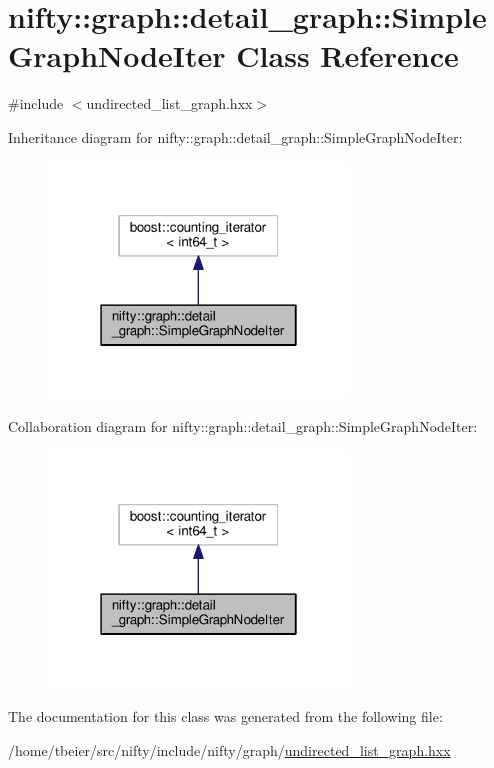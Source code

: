 \hypertarget{classnifty_1_1graph_1_1detail__graph_1_1SimpleGraphNodeIter}{}\section{nifty\+:\+:graph\+:\+:detail\+\_\+graph\+:\+:Simple\+Graph\+Node\+Iter Class Reference}
\label{classnifty_1_1graph_1_1detail__graph_1_1SimpleGraphNodeIter}


{\ttfamily \#include $<$undirected\+\_\+list\+\_\+graph.\+hxx$>$}



Inheritance diagram for nifty\+:\+:graph\+:\+:detail\+\_\+graph\+:\+:Simple\+Graph\+Node\+Iter\+:\nopagebreak
\begin{figure}[H]
\begin{center}
\leavevmode
\includegraphics[width=226pt]{classnifty_1_1graph_1_1detail__graph_1_1SimpleGraphNodeIter__inherit__graph}
\end{center}
\end{figure}


Collaboration diagram for nifty\+:\+:graph\+:\+:detail\+\_\+graph\+:\+:Simple\+Graph\+Node\+Iter\+:\nopagebreak
\begin{figure}[H]
\begin{center}
\leavevmode
\includegraphics[width=226pt]{classnifty_1_1graph_1_1detail__graph_1_1SimpleGraphNodeIter__coll__graph}
\end{center}
\end{figure}


The documentation for this class was generated from the following file\+:\begin{DoxyCompactItemize}
\item 
/home/tbeier/src/nifty/include/nifty/graph/\hyperlink{graph_2undirected__list__graph_8hxx}{undirected\+\_\+list\+\_\+graph.\+hxx}\end{DoxyCompactItemize}
